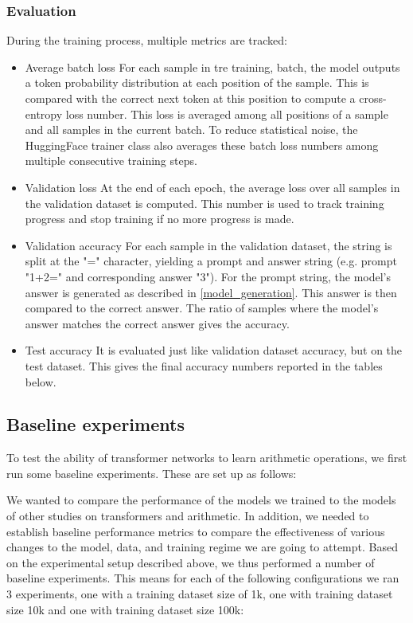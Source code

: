 \subsubsection{Evaluation}

During the training process, multiple metrics are tracked:

\begin{itemize}
	\item{Average batch loss}
	For each sample in tre training, batch, the model outputs a token probability distribution at each position of the sample. This is compared with the correct next token at this position to compute a cross-entropy loss number. This loss is averaged among all positions of a sample and all samples in the current batch. To reduce statistical noise, the HuggingFace trainer class also averages these batch loss numbers among multiple consecutive training steps.
	
	\item{Validation loss}
	At the end of each epoch, the average loss over all samples in the validation dataset is computed. This number is used to track training progress and stop training if no more progress is made.
	
	\item{Validation accuracy}
	For each sample in the validation dataset, the string is split at the "=" character, yielding a prompt and answer string (e.g. prompt "1+2=" and corresponding answer "3"). For the prompt string, the model's answer is generated as described in \cref{model_generation}. This answer is then compared to the correct answer. The ratio of samples where the model's answer matches the correct answer gives the accuracy.
	
	\item{Test accuracy}
	It is evaluated just like validation dataset accuracy, but on the test dataset. This gives the final accuracy numbers reported in the tables below.
\end{itemize}



\subsection{Baseline experiments}

To test the ability of transformer networks to learn arithmetic operations, we first run some baseline experiments. These are set up as follows:

We wanted to compare the performance of the models we trained to the models of other studies on transformers and arithmetic. In addition, we needed to establish baseline performance metrics to compare the effectiveness of various changes to the model, data, and training regime we are going to attempt.
Based on the experimental setup described above, we thus performed a number of baseline experiments. This means for each of the following configurations we ran 3 experiments, one with a training dataset size of 1k, one with training dataset size 10k and one with training dataset size 100k:

